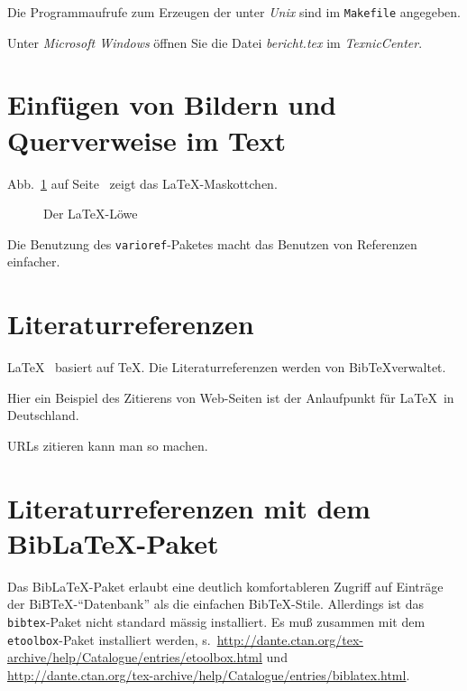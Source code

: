 Die Programmaufrufe zum Erzeugen der  unter \emph{Unix}
sind im \texttt{Makefile} angegeben.

Unter \emph{Microsoft Windows} öffnen Sie die Datei \emph{bericht.tex} im \emph{TexnicCenter}.

\section{Einfügen von Bildern und Querverweise im Text}


Abb.~\ref{fig-loewe} auf Seite~\pageref{fig-loewe} zeigt das \LaTeX-Maskottchen.
\begin{figure}[htbp]
\centering
{}
\caption{\label{fig-loewe}Der \LaTeX-Löwe}
\end{figure}
Die Benutzung des \texttt{varioref}-Paketes macht das Benutzen von Referenzen einfacher.


\section{Literaturreferenzen}

\LaTeX\ \cite{lamport.1995a} basiert auf \TeX \cite{knuth.1984a}.
Die Literaturreferenzen werden von Bib\TeX verwaltet.

Hier ein Beispiel des Zitierens von Web-Seiten
\cite{dante.2010a} ist der Anlaufpunkt für \LaTeX\ in Deutschland.

URLs zitieren kann man so \cite{dante.2010a} machen.

\section{Literaturreferenzen mit dem Bib\LaTeX-Paket}

Das Bib\LaTeX-Paket erlaubt eine deutlich komfortableren Zugriff auf Einträge der
BiB\TeX-"`Datenbank"' als die einfachen Bib\TeX-Stile. Allerdings ist das \texttt{bibtex}-Paket
nicht standard mässig installiert. Es muß zusammen mit dem \texttt{etoolbox}-Paket installiert
werden, s.\
\url{http://dante.ctan.org/tex-archive/help/Catalogue/entries/etoolbox.html} und\\
\url{http://dante.ctan.org/tex-archive/help/Catalogue/entries/biblatex.html}.


